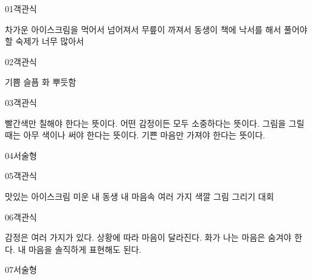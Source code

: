 \documentclass[fs13,seriesSau]{korfarm-base}
\begin{document}
\begin{kfQBlock}{01}{객관식}
\begin{kfChoices}
\kfChoice 차가운 아이스크림을 먹어서
\kfChoice 넘어져서 무릎이 까져서
\kfChoice 동생이 책에 낙서를 해서
\kfChoice 풀어야 할 숙제가 너무 많아서
\end{kfChoices}
\end{kfQBlock}
\begin{kfQBlock}{02}{객관식}
\begin{kfChoices}
\kfChoice 기쁨
\kfChoice 슬픔
\kfChoice 화
\kfChoice 뿌듯함
\end{kfChoices}
\end{kfQBlock}
\begin{kfQBlock}{03}{객관식}
\begin{kfChoices}
\kfChoice 빨간색만 칠해야 한다는 뜻이다.
\kfChoice 어떤 감정이든 모두 소중하다는 뜻이다.
\kfChoice 그림을 그릴 때는 아무 색이나 써야 한다는 뜻이다.
\kfChoice 기쁜 마음만 가져야 한다는 뜻이다.
\end{kfChoices}
\end{kfQBlock}
\begin{kfQBlock}{04}{서술형}
\end{kfQBlock}
\begin{kfQBlock}{05}{객관식}
\begin{kfChoices}
\kfChoice 맛있는 아이스크림
\kfChoice 미운 내 동생
\kfChoice 내 마음속 여러 가지 색깔
\kfChoice 그림 그리기 대회
\end{kfChoices}
\end{kfQBlock}
\begin{kfQBlock}{06}{객관식}
\begin{kfChoices}
\kfChoice 감정은 여러 가지가 있다.
\kfChoice 상황에 따라 마음이 달라진다.
\kfChoice 화가 나는 마음은 숨겨야 한다.
\kfChoice 내 마음을 솔직하게 표현해도 된다.
\end{kfChoices}
\end{kfQBlock}
\begin{kfQBlock}{07}{서술형}
\end{kfQBlock}
\end{document}
